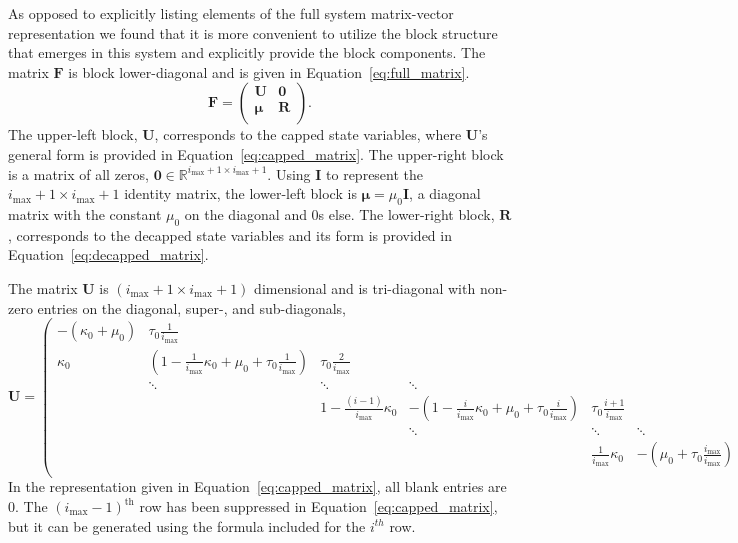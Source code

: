 \documentclass[review]{elsarticle}
\newcommand{\imax}{\ensuremath{{i_{\max}}}\xspace}
\let\bs\boldsymbol
\begin{document}
As opposed to explicitly listing elements of the full system matrix-vector representation we found that it is more convenient to utilize the block structure that emerges in this system and explicitly provide the block components.
The matrix $\bs{F}$ is block lower-diagonal and is given in Equation~\ref{eq:full_matrix}.
\begin{equation}
\bs{F}=\left(\begin{array}{cc}
\bs{U} & \bs{0} \\
\bs{\mu} & \bs{R} \\
\end{array} \right).
\end{equation}
The upper-left block, $\bs{U}$, corresponds to the capped state variables, where $\bs{U}$'s general form is provided in Equation~\ref{eq:capped_matrix}.
The upper-right block is a matrix of all zeros, $\bs{0}\in\mathbb{R}^{\imax+1\times \imax+1}$.
Using $\bs{I}$ to represent the $\imax+1\times \imax+1$ identity matrix, the lower-left block is $\bs{\mu}=\mu_0\bs{I}$, a diagonal matrix with the constant $\mu_0$ on the diagonal and 0s else.
The lower-right block, $\bs{R}$, corresponds to the decapped state variables and its form is provided in Equation~\ref{eq:decapped_matrix}.

The matrix $\bs{U}$ is $(\imax+1\times \imax+1)$ dimensional and is tri-diagonal with non-zero entries on the diagonal, super-, and sub-diagonals,
\begin{equation}
\bs{U}=\left(\begin{array}{cccccc}
-(\kappa_0+\mu_0) & \tau_0\frac{1}{\imax} &  &  &  & \\
\kappa_0 & \left(1-\frac{1}{\imax} \kappa_0+\mu_0+\tau_0\frac{1}{\imax}\right) & \tau_0\frac{2}{\imax} &  &  & \\
   &\ddots        & \ddots        & \ddots & &  \\
   & &    1-\frac{(i-1)}{\imax}\kappa_0 & -\left(1-\frac{i}{\imax}\kappa_0+\mu_0+\tau_0\frac{i}{\imax}\right) & \tau_0\frac{i+1}{\imax} & \\
                  &         &        & \ddots  & \ddots & \ddots \\
     
                          &        &  &  & \frac{1}{\imax}\kappa_0 & -\left(\mu_0+\tau_0\frac{\imax}{\imax}\right) \\
\end{array}\right).
\end{equation}
In the representation given in Equation~\ref{eq:capped_matrix}, all blank entries are 0.
The $(\imax-1)^{\text{th}}$ row has been suppressed in Equation~\ref{eq:capped_matrix}, but it can be generated using the formula included for the $i^{th}$ row.
\end{document}

